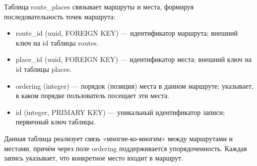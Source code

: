 Таблица route\_places связывает маршруты и места, формируя последовательность точек маршрута:
\begin{itemize}
    \item route\_id (uuid, FOREIGN KEY) — идентификатор маршрута; внешний ключ на id таблицы routes.
    \item place\_id (uuid, FOREIGN KEY) — идентификатор места; внешний ключ на id таблицы places.
    \item ordering (integer) — порядок (позиция) места в данном маршруте; указывает, в каком порядке пользователь посещает эти места.
    \item id (integer, PRIMARY KEY) — уникальный идентификатор записи; первичный ключ таблицы.
\end{itemize}
Данная таблица реализует связь «многие-ко-многим» между маршрутами и местами, причём через поле ordering поддерживается упорядоченность. Каждая запись указывает, что конкретное место входит в маршрут.

